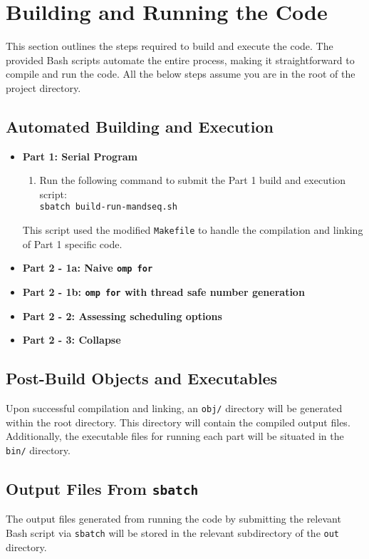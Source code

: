 \documentclass{article}
\begin{document}
\section{Building and Running the Code}

This section outlines the steps required to build and execute the code. The provided Bash scripts automate the entire process, 
making it straightforward to compile and run the code. All the below steps assume 
you are in the root of the project directory.

\subsection{Automated Building and Execution}
\begin{itemize}
    \item \textbf{Part 1: Serial Program} 
    \begin{enumerate}
        \item Run the following command to submit the Part 1 build and execution script: \\
        \texttt{sbatch build-run-mandseq.sh}
    \end{enumerate}
    This script used the modified \texttt{Makefile} to handle the compilation and linking of Part 1 specific code.
    
    \item \textbf{Part 2 - 1a: Naive \texttt{omp for}}
    \item \textbf{Part 2 - 1b: \texttt{omp for} with thread safe number generation}
    \item \textbf{Part 2 - 2: Assessing scheduling options}
    \item \textbf{Part 2 - 3: Collapse}
\end{itemize}

\subsection{Post-Build Objects and Executables}
Upon successful compilation and linking, an \texttt{obj/} directory will be generated within the root directory. 
This directory will contain the compiled output files. Additionally, the executable files for running each part will be 
situated in the \texttt{bin/} directory.

\subsection{Output Files From \texttt{sbatch}}
The output files generated from running the code by submitting the relevant Bash script via \texttt{sbatch} will be 
stored in the relevant subdirectory of the \texttt{out} directory. 
\end{document}
